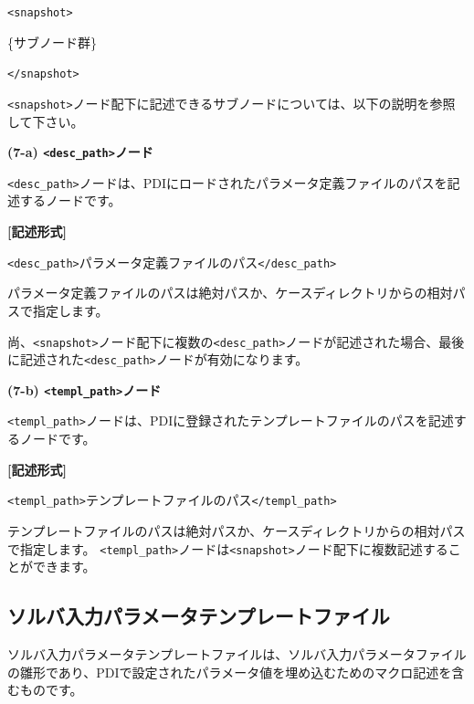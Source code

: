 \documentclass[a4paper,11pt]{jarticle}
\begin{document}
{\leftskip=42pt
\texttt{<snapshot>}    

\parindent=14pt
\{サブノード群\}

\parindent=0pt
\texttt{</snapshot>}

\vspace{8pt}
\leftskip=0pt
\texttt{<snapshot>}ノード配下に記述できるサブノードについては、以下の説明を参照して下さい。

\vspace{12pt}
\textbf{(7-a) \texttt{<desc\_path>}ノード}

\texttt{<desc\_path>}ノードは、PDIにロードされたパラメータ定義ファイルのパスを記述するノードです。

\vspace{8pt}
\leftskip=12pt
\textbf{[記述形式]}

\leftskip=42pt
\texttt{<desc\_path>}パラメータ定義ファイルのパス\texttt{</desc\_path>}

\vspace{8pt}
\leftskip=0pt
パラメータ定義ファイルのパスは絶対パスか、ケースディレクトリからの相対パスで指定します。

尚、\texttt{<snapshot>}ノード配下に複数の\texttt{<desc\_path>}ノードが記述された場合、最後に記述された\texttt{<desc\_path>}ノードが有効になります。

\vspace{12pt}
\textbf{(7-b) \texttt{<templ\_path>}ノード}

\texttt{<templ\_path>}ノードは、PDIに登録されたテンプレートファイルのパスを記述するノードです。

\vspace{8pt}
\leftskip=12pt
\textbf{[記述形式]}

\leftskip=42pt
\texttt{<templ\_path>}テンプレートファイルのパス\texttt{</templ\_path>}

\vspace{8pt}
\leftskip=0pt
テンプレートファイルのパスは絶対パスか、ケースディレクトリからの相対パスで指定します。
\texttt{<templ\_path>}ノードは\texttt{<snapshot>}ノード配下に複数記述することができます。

\newpage
\subsection{ソルバ入力パラメータテンプレートファイル}

ソルバ入力パラメータテンプレートファイルは、ソルバ入力パラメータファイルの雛形であり、PDIで設定されたパラメータ値を埋め込むためのマクロ記述を含むものです。

}
\end{document}
